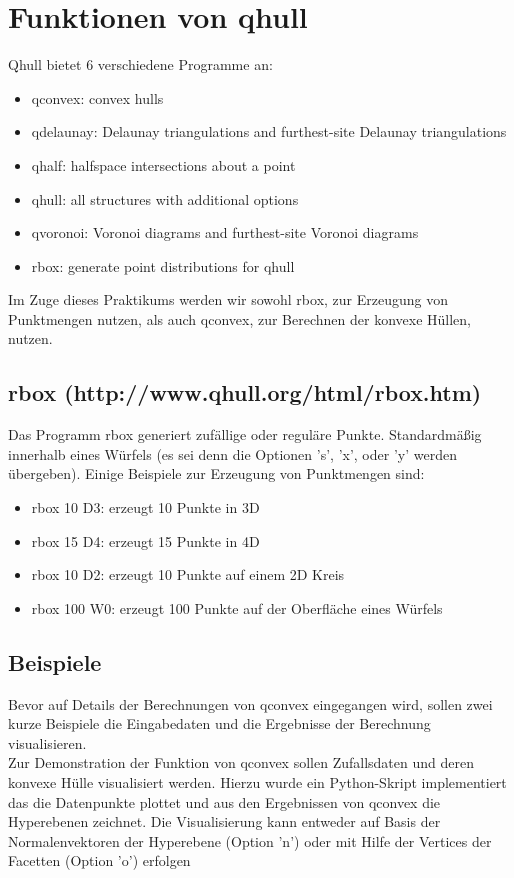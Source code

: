 \documentclass[12pt]{scrartcl}
\begin{document}
\section{Funktionen von qhull}

Qhull bietet 6 verschiedene Programme an:
\begin{itemize}
    \setlength\itemsep{0em}
    \item qconvex: convex hulls
    \item qdelaunay: Delaunay triangulations and furthest-site Delaunay triangulations
    \item qhalf: halfspace intersections about a point
    \item qhull: all structures with additional options
    \item qvoronoi: Voronoi diagrams and furthest-site Voronoi diagrams
    \item rbox: generate point distributions for qhull
\end{itemize}

Im Zuge dieses Praktikums werden wir sowohl rbox, zur Erzeugung von Punktmengen nutzen, als auch qconvex, zur Berechnen der konvexe Hüllen, nutzen.



\subsection{rbox (http://www.qhull.org/html/rbox.htm)}
Das Programm rbox generiert zufällige oder reguläre Punkte. Standardmäßig innerhalb eines Würfels (es sei denn die Optionen 's', 'x', oder 'y' werden übergeben).
Einige Beispiele zur Erzeugung von Punktmengen sind:
\begin{itemize}
    \setlength\itemsep{0em}
    \item rbox 10 D3: erzeugt 10 Punkte in 3D
    \item rbox 15 D4: erzeugt 15 Punkte in 4D
    \item rbox 10 D2: erzeugt 10 Punkte auf einem 2D Kreis
    \item rbox 100 W0: erzeugt 100 Punkte  auf der Oberfläche eines Würfels
\end{itemize}

\subsection{Beispiele}
Bevor auf Details der Berechnungen von qconvex eingegangen wird, sollen zwei kurze Beispiele die Eingabedaten und die Ergebnisse der Berechnung visualisieren.\\
Zur Demonstration der Funktion von qconvex sollen Zufallsdaten und deren konvexe Hülle visualisiert werden. Hierzu wurde ein Python-Skript implementiert das die Datenpunkte plottet und aus den Ergebnissen von qconvex die Hyperebenen zeichnet. Die Visualisierung kann entweder auf Basis der Normalenvektoren der Hyperebene (Option 'n') oder mit Hilfe der Vertices der Facetten (Option 'o') erfolgen
\end{document}
